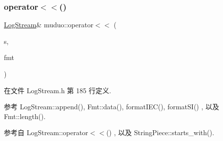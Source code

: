 \subsubsection{\texorpdfstring{operator$<$$<$()}{operator<<()}}
{\footnotesize\ttfamily \hyperlink{classmuduo_1_1LogStream}{Log\+Stream}\& muduo\+::operator$<$$<$ (\begin{DoxyParamCaption}\item[{\hyperlink{classmuduo_1_1LogStream}{Log\+Stream} \&}]{s,  }\item[{const \hyperlink{classmuduo_1_1Fmt}{Fmt} \&}]{fmt }\end{DoxyParamCaption})\hspace{0.3cm}{\ttfamily [inline]}}



在文件 Log\+Stream.\+h 第 185 行定义.



参考 Log\+Stream\+::append(), Fmt\+::data(), format\+I\+E\+C(), format\+S\+I() , 以及 Fmt\+::length().



参考自 Log\+Stream\+::operator$<$$<$() , 以及 String\+Piece\+::starts\+\_\+with().

